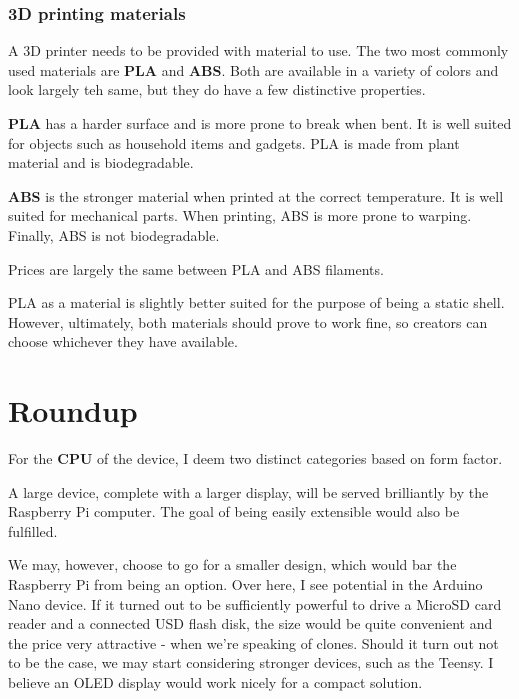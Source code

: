             \subsubsection{3D printing materials}
                A 3D printer needs to be provided with material to use.  The two most commonly used materials are \textbf{PLA} and \textbf{ABS}\cite{all3dp-best-fileament-types}.  Both are available in a variety of colors and look largely teh same, but they do have a few distinctive properties\cite{all3dp-pla-abs}. 
                
                \textbf{PLA} has a harder surface and is more prone to break when bent.  It is well suited for objects such as household items and gadgets.  PLA is made from plant material and is biodegradable.
                
                \textbf{ABS} is the stronger material when printed at the correct temperature.  It is well suited for mechanical parts.  When printing, ABS is more prone to warping.  Finally, ABS is not biodegradable.
                
                Prices are largely the same between PLA and ABS filaments.
                
                PLA as a material is slightly better suited for the purpose of being a static shell.  However, ultimately, both materials should prove to work fine, so creators can choose whichever they have available.
                
    \section{Roundup}
        For the \textbf{CPU} of the device, I deem two distinct categories based on form factor.
        
        A large device, complete with a larger display, will be served brilliantly by the Raspberry Pi computer.  The goal of being easily extensible would also be fulfilled.
        
        We may, however, choose to go for a smaller design, which would bar the Raspberry Pi from being an option.  Over here, I see potential in the Arduino Nano device.  If it turned out to be sufficiently powerful to drive a MicroSD card reader and a connected USD flash disk, the size would be quite convenient and the price very attractive - when we're speaking of clones.  Should it turn out not to be the case, we may start considering stronger devices, such as the Teensy.  I believe an OLED display would work nicely for a compact solution.
        
